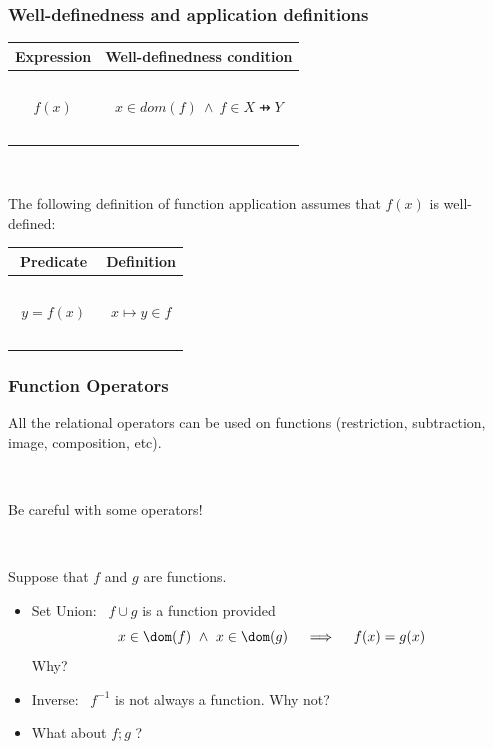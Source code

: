 \documentclass{beamer}
\begin{document}
\begin{frame}

\frametitle{Well-definedness and application definitions}

\begin{center}
\begin{tabular}{|c|c|}
\hline
Expression & Well-definedness condition \\[2pt] \hline
~&\\
$~~ f(x) ~~$ &  $~~x\in dom(f) ~\land~  f\in X \pfun Y ~~$  \\
~&\\ \hline\end{tabular}
\end{center}

~

The following definition of function application assumes that $f(x)$ is well-defined:

\begin{center}
\begin{tabular}{|c|c|}
\hline
Predicate & Definition \\[2pt] \hline
~&\\
$~~y = f(x) ~~$ &  $~x \mapsto y \in f~$  \\
~&\\ \hline\end{tabular}
\end{center}


\end{frame}





\begin{frame}

\frametitle{Function Operators}

All the \alert{relational operators} can be used on  functions
(restriction, subtraction, image, composition, etc).

~

Be \alert{careful} with some operators!

~

Suppose that $f$ and $g$ are functions.

\begin{itemize}
\item Set Union:~ $f \cup g$ is a  function provided
\[
    x\in \dom(f) ~\land~ x\in \dom(g) ~~~\implies~~~ f(x) = g(x)
\]
Why?


\item Inverse:~ $f^{-1}$ is not always a  function. Why
not?

\item What about $f;g$ ? 
\end{itemize}


\end{frame}
\end{document}
